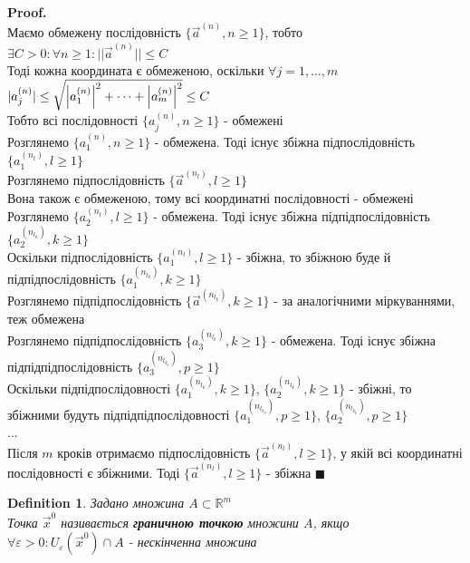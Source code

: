\documentclass[a4paper, 14pt]{extarticle}
\theoremstyle{theoremdd}
\theoremstyle{theoremdd}
\newtheorem{definition}[theorem]{Definition}
\theoremstyle{theoremdd}
\theoremstyle{theoremdd}
\theoremstyle{theoremdd}
\theoremstyle{theoremdd}
\theoremstyle{theoremdd}
\newenvironment{pf}{\vspace*{-3mm} \textbf{Proof. \\}}{$\blacksquare$}
\begin{document}
\begin{pf}
Маємо обмежену послідовність $\{\vec{a}^{(n)}, n \geq 1\}$, тобто\\
$\exists C > 0: \forall n \geq 1: ||\vec{a}^{(n)}|| \leq C$\\
Тоді кожна координата є обмеженою, оскільки $\forall j = 1,\dots, m$\\
$|a_j^{(n)}| \leq \sqrt{\abs{a_1^{(n)}}^2 + \dots + \abs{a_m^{(n)}}^2} \leq C$\\
Тобто всі послідовності $\{a_j^{(n)}, n \geq 1\}$ - обмежені\\
Розглянемо $\{a_1^{(n)}, n \geq 1\}$ - обмежена. Тоді існує збіжна підпослідовність $\{a_1^{(n_l)}, l \geq 1\}$\\
Розглянемо підпослідовність $\{\vec{a}^{(n_l)}, l \geq 1\}$\\
Вона також є обмеженою, тому всі координатні послідовності - обмежені\\
Розглянемо $\{a_2^{(n_l)}, l \geq 1\}$ - обмежена. Тоді існує збіжна підпідпослідовність $\{a_2^{(n_{l_k})}, k \geq 1 \}$\\
Оскільки підпослідовність $\{a_1^{(n_l)}, l \geq 1 \}$ - збіжна, то збіжною буде й підпідпослідовність $\{a_1^{(n_{l_k})}, k \geq 1 \}$\\
Розглянемо підпідпослідовність $\{\vec{a}^{(n_{l_k})}, k \geq 1\}$ - за аналогічними міркуваннями, теж обмежена\\
Розглянемо підпідпослідовність $\{a_3^{(n_{l_k})}, k \geq 1 \}$ - обмежена. Тоді існує збіжна підпідпідпослідовність $\{a_3^{(n_{l_{k_p}})}, p \geq 1 \}$\\
Оскільки підпідпослідовності $\{a_1^{(n_{l_k})}, k \geq 1 \}$, $\{a_2^{(n_{l_k})}, k \geq 1 \}$ - збіжні, то збіжними будуть підпідпідпослідовності  $\{a_1^{(n_{l_{k_p}})}, p \geq 1 \}$, $\{a_2^{(n_{l_{k_p}})}, p \geq 1 \}$\\
...
\\
Після $m$ кроків отримаємо підпослідовність $\{\vec{a}^{(n_l)}, l \geq 1\}$, у якій всі координатні послідовності є збіжними. Тоді $\{\vec{a}^{(n_l)}, l \geq 1\}$ - збіжна
\end{pf}

\begin{definition}
Задано множина $A \subset \mathbb{R}^m$\\
Точка $\vec{x}^0$ називається \textbf{граничною точкою} множини $A$, якщо $\forall \varepsilon > 0: U_{\varepsilon}(\vec{x}^0) \cap A$ - нескінченна множина
\end{definition}
\end{document}
